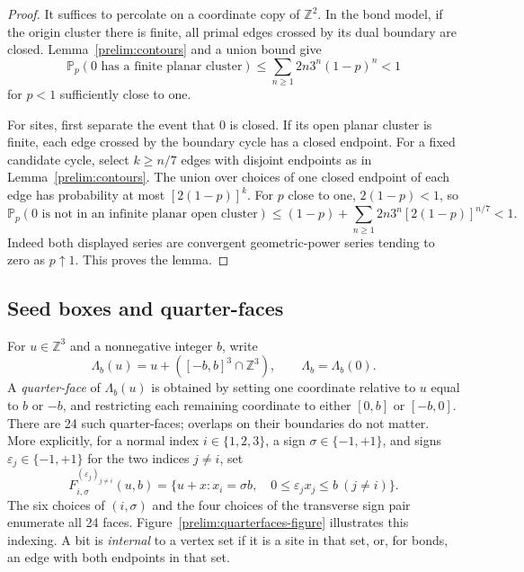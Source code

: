 \documentclass[11pt]{article}
\theoremstyle{definition}
\theoremstyle{remark}
\numberwithin{equation}{section}
\begin{document}
\begin{proof}
It suffices to percolate on a coordinate copy of $\mathbb Z^2$. In the bond
model, if the origin cluster there is finite, all primal edges crossed by its
dual boundary are closed. Lemma~\ref{prelim:contours} and a union bound give
\[
 \mathbb P_p(0\text{ has a finite planar cluster})
 \le \sum_{n\ge1}2n3^n(1-p)^n<1
\]
for $p<1$ sufficiently close to one.

For sites, first separate the event that $0$ is closed. If its open planar
cluster is finite, each edge crossed by the boundary cycle has a closed
endpoint. For a fixed candidate cycle, select $k\ge n/7$ edges with disjoint
endpoints as in Lemma~\ref{prelim:contours}. The union over choices of one
closed endpoint of each edge has probability at most $[2(1-p)]^k$.
For $p$ close to one, $2(1-p)<1$, so
\[
 \mathbb P_p(0\text{ is not in an infinite planar open cluster})
 \le (1-p)+\sum_{n\ge1}2n3^n[2(1-p)]^{n/7}<1.
\]
Indeed both displayed series are convergent geometric-power series tending
to zero as $p\uparrow1$. This proves the lemma.
\end{proof}

\subsection{Seed boxes and quarter-faces}

For $u\in\mathbb Z^3$ and a nonnegative integer $b$, write
\[
 \Lambda_b(u)=u+([-b,b]^3\cap\mathbb Z^3),\qquad \Lambda_b=\Lambda_b(0).
\]
A \emph{quarter-face} of $\Lambda_b(u)$ is obtained by setting one coordinate
relative to $u$ equal to $b$ or $-b$, and restricting each remaining coordinate
to either $[0,b]$ or $[-b,0]$. There are 24 such quarter-faces; overlaps on their
boundaries do not matter. More explicitly, for a normal index
$i\in\{1,2,3\}$, a sign $\sigma\in\{-1,+1\}$, and signs
$\varepsilon_j\in\{-1,+1\}$ for the two indices $j\ne i$, set
\begin{equation}\label{prelim:face-index}
 F_{i,\sigma}^{(\varepsilon_j)_{j\ne i}}(u,b)
 =\{u+x:x_i=\sigma b,\quad
                  0\le\varepsilon_jx_j\le b\ (j\ne i)\}.
\end{equation}
The six choices of $(i,\sigma)$ and the four choices of the transverse
sign pair enumerate all 24 faces. Figure~\ref{prelim:quarterfaces-figure}
illustrates this indexing.
A bit is \emph{internal} to a vertex set if it is a
site in that set, or, for bonds, an edge with both endpoints in that set.
\end{document}
